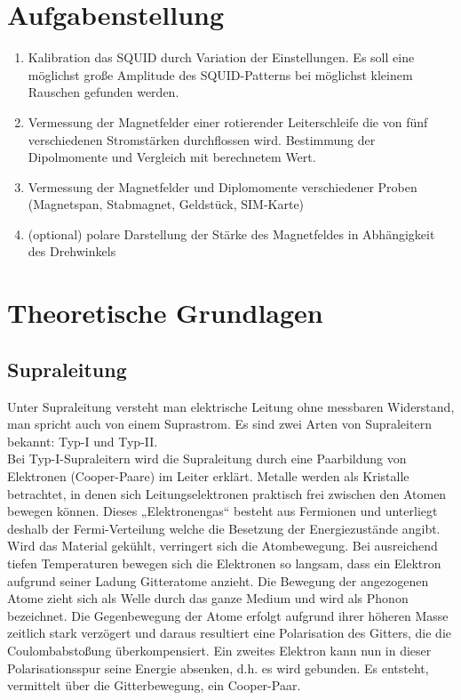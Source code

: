 \documentclass[12pt]{article}
\begin{document}
\section{Aufgabenstellung}
\begin{enumerate}
 \item Kalibration das SQUID durch Variation der Einstellungen. Es soll eine möglichst große Amplitude des SQUID-Patterns bei möglichst kleinem Rauschen gefunden werden.
\item Vermessung der Magnetfelder einer rotierender Leiterschleife die von fünf verschiedenen Stromstärken durchflossen wird. Bestimmung der Dipolmomente und Vergleich mit berechnetem Wert.
\item Vermessung der Magnetfelder und Diplomomente verschiedener Proben (Magnetspan, Stabmagnet, Geldstück, SIM-Karte)
\item (optional) polare Darstellung der Stärke des Magnetfeldes in Abhängigkeit des Drehwinkels
\end{enumerate}
\newpage

\section{Theoretische Grundlagen}
\subsection{Supraleitung}
Unter Supraleitung versteht man elektrische Leitung ohne messbaren Widerstand, man spricht auch von einem Suprastrom.
Es sind zwei Arten von Supraleitern bekannt: Typ-I und Typ-II. \\

Bei Typ-I-Supraleitern wird die Supraleitung durch eine Paarbildung von Elektronen (Cooper-Paare) im Leiter erklärt.
Metalle werden als Kristalle betrachtet, in denen sich Leitungselektronen praktisch frei zwischen den Atomen bewegen können. Dieses „Elektronengas“ besteht aus Fermionen und unterliegt deshalb der Fermi-Verteilung welche die Besetzung der Energiezustände angibt. Wird das Material gekühlt, verringert sich die Atombewegung. Bei ausreichend tiefen Temperaturen bewegen sich die Elektronen so langsam, dass ein Elektron aufgrund seiner Ladung Gitteratome anzieht. Die Bewegung der angezogenen Atome zieht sich als Welle durch das ganze Medium und wird als Phonon bezeichnet. Die Gegenbewegung der Atome erfolgt aufgrund ihrer höheren Masse zeitlich stark verzögert und daraus resultiert eine Polarisation des Gitters, die die Coulombabstoßung überkompensiert. Ein zweites Elektron kann nun in dieser Polarisationsspur seine Energie absenken, d.h. es wird gebunden. Es entsteht, vermittelt über die Gitterbewegung, ein Cooper-Paar.\\
\end{document}

